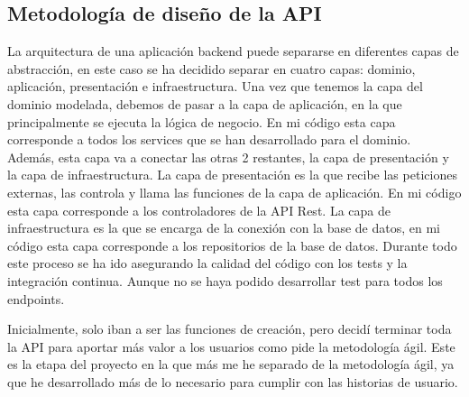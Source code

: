 \subsection*{Metodología de diseño de la API}
La arquitectura de una aplicación backend puede separarse en diferentes capas de abstracción, en este caso se ha decidido separar en cuatro capas: dominio, aplicación, presentación e infraestructura.
Una vez que tenemos la capa del dominio modelada, debemos de pasar a la capa de aplicación, en la que principalmente se ejecuta la lógica de negocio. En mi código esta capa
corresponde a todos los services que se han desarrollado para el dominio. Además, esta capa va a conectar las otras 2 restantes, la capa de presentación y la capa de infraestructura.
La capa de presentación es la que recibe las peticiones externas, las controla y llama las funciones de la capa de aplicación. En mi código esta capa corresponde a los controladores de la API Rest.
La capa de infraestructura es la que se encarga de la conexión con la base de datos, en mi código esta capa corresponde a los repositorios de la base de datos.
Durante todo este proceso se ha ido asegurando la calidad del código con los tests y la integración continua. Aunque no se haya podido desarrollar test para todos los endpoints.

Inicialmente, solo iban a ser las funciones de creación, pero decidí terminar toda la API para aportar más valor a los usuarios como pide la metodología ágil.
Este es la etapa del proyecto en la que más me he separado de la metodología ágil, ya que he desarrollado más de lo necesario para cumplir con las historias de usuario.
